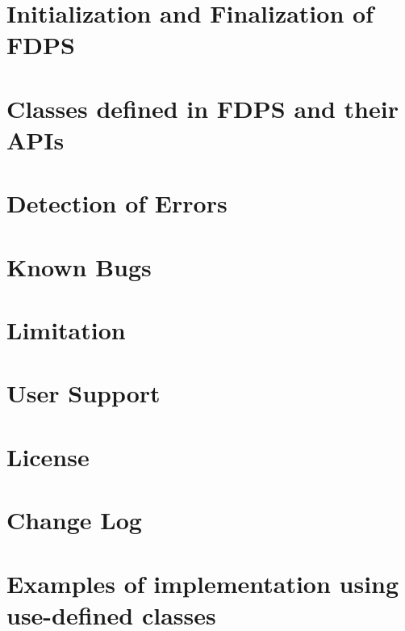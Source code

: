 \documentclass[12pt,a4paper,dvipdfmx]{article}
\begin{document}
\section{Initialization and Finalization of FDPS}
\label{sec:initfin}

\newpage

\section{Classes defined in FDPS and their APIs}
\label{sec:module}

\newpage

\section{Detection of Errors}
\label{sec:errormessage}

\newpage


\section{Known Bugs}
\label{sec:knownbug}


\newpage

\section{Limitation}
\label{sec:limitation}

\newpage

\section{User Support}
\label{sec:usersupport}
%
\newpage

\section{License}
\label{sec:license}

\newpage

\section{Change Log}
\label{sec:changelog}


\newpage

\appendix

\section{Examples of implementation using use-defined classes}
\label{sec:example_userdefined}

\end{document}
